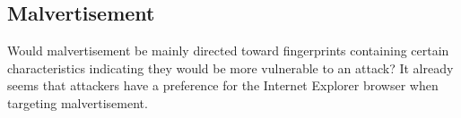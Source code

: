 \subsection{Malvertisement}

Would malvertisement be mainly directed toward
fingerprints containing certain characteristics
indicating they would be more vulnerable to an attack?
It already seems that attackers have a preference
for the Internet Explorer browser
when targeting malvertisement.
\cite{li2012knowing}
